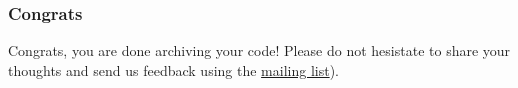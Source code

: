 \documentclass[]{article}
\begin{document}
\hypertarget{congrats}{%
\subsubsection{Congrats}\label{congrats}}

Congrats, you are done archiving your code! Please do not hesistate to
share your thoughts and send us feedback using the
\href{https://sympa.inria.fr/sympa/subscribe/swhap-inria?previous_action=info}{mailing
list}).

\printbibliography
\end{document}
